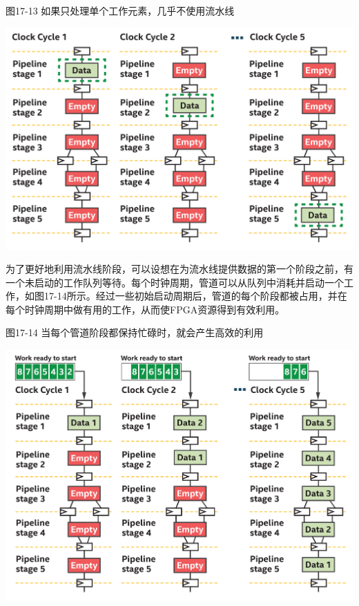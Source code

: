 \hspace*{\fill} \par %
图17-13 如果只处理单个工作元素，几乎不使用流水线
\begin{center}
	\includegraphics[width=1.0\textwidth]{content/chapter-17/images/12}
\end{center}

为了更好地利用流水线阶段，可以设想在为流水线提供数据的第一个阶段之前，有一个未启动的工作队列等待。每个时钟周期，管道可以从队列中消耗并启动一个工作，如图17-14所示。经过一些初始启动周期后，管道的每个阶段都被占用，并在每个时钟周期中做有用的工作，从而使FPGA资源得到有效利用。\par

\hspace*{\fill} \par %
图17-14 当每个管道阶段都保持忙碌时，就会产生高效的利用
\begin{center}
	\includegraphics[width=1.0\textwidth]{content/chapter-17/images/13}
\end{center}

